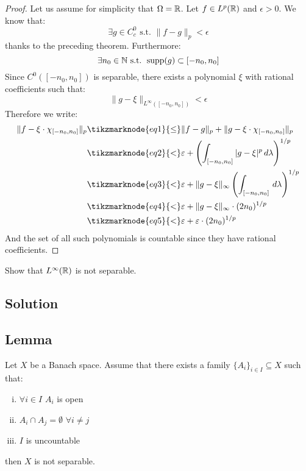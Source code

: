 \begin{proof}
    Let us assume for simplicity that $\Omega = \mathbb{R}$. Let $f\in L^p(\mathbb{R})$ and $\epsilon>0$. We know that:
    \[ \exists g \in C^0_c \text{ s.t. } \|f-g\|_p < \epsilon\]
    thanks to the preceding theorem. Furthermore:
    \[ \exists n_0 \in \mathbb{N} \text{ s.t. } \operatorname{supp}(g)\subset[-n_0,n_0]\]
    Since $C^0([-n_0,n_0])$ is separable, there exists a polynomial $\xi$ with rational coefficients such that:
    \[ \|g-\xi\|_{L^\infty([-n_0,n_0])} < \epsilon \]
    Therefore we write:
    \begin{align*}
        \| f - \xi \cdot \chi_{[-n_0,n_0]} \|_p & \tikzmarknode{eq1}{\leq} \| f - g \|_p + \| g - \xi \cdot \chi_{[-n_0,n_0]} \|_p \\
        & \tikzmarknode{eq2}{<} \epsilon + \left( \int_{[-n_0,n_0]} |g-\xi|^p \, d\lambda \right)^{1/p} \\
        & \tikzmarknode{eq3}{<} \epsilon + \|g-\xi\|_\infty \left( \int_{[-n_0,n_0]} \, d\lambda \right)^{1/p} \\
        & \tikzmarknode{eq4}{<} \epsilon + \|g-\xi\|_\infty \cdot (2n_0)^{1/p} \\
        & \tikzmarknode{eq5}{<} \epsilon + \epsilon \cdot (2n_0)^{1/p}
    \end{align*}
    And the set of all such polynomials is countable since they have rational coefficients.
\end{proof}


\question
Show that $L^\infty(\mathbb{R})$ is not separable.

\subsection*{Solution}

\subsection{Lemma}
Let $X$ be a Banach space. Assume that there exists a family $\{A_i\}_{i\in I} \subseteq X$ such that:
\begin{enumerate}[i)]
    \item $\forall i \in I$ $A_i$ is open
    \item $A_i \cap A_j = \emptyset$ $\forall i \neq j$
    \item $I$ is uncountable
\end{enumerate}
then $X$ is not separable.

